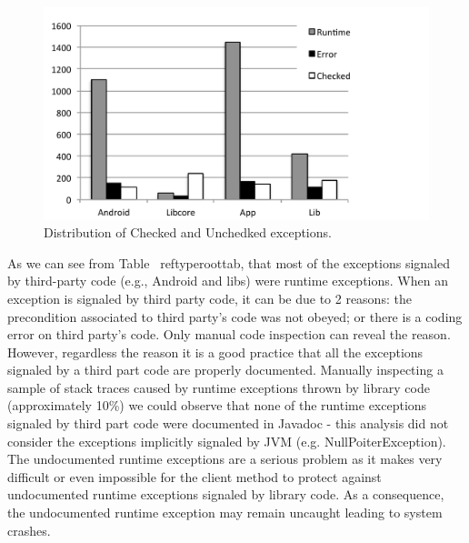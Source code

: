 \documentclass[conference]{IEEEtran}
\begin{document}
\begin{figure}
\centering
\includegraphics[scale=0.3]{chart_exceptiontypes.pdf}
\caption{Distribution of Checked and Unchedked exceptions.}
\label{fig:typeroot}
\end{figure}


As we can see from Table ~ref{typeroottab}, that most of the exceptions signaled by third-party code (e.g., Android and libs) were runtime exceptions. 
When an exception is signaled by third party code, it can be due to 2 reasons: the precondition associated to third party's code was not obeyed; or there is a coding error on third party's code. Only manual code inspection can reveal the reason. However, regardless the reason it is a good practice that all the exceptions signaled by a third part code are properly documented. Manually inspecting a sample of stack traces caused by runtime exceptions thrown by library code (approximately 10\%) we could observe that none of the runtime exceptions signaled by third part code were documented in Javadoc - this analysis did not consider the exceptions implicitly signaled by JVM (e.g. NullPoiterException). The undocumented runtime exceptions are a serious problem as it makes very difficult or even impossible for the  client method to protect against  undocumented runtime exceptions signaled by library code. As a consequence, the undocumented runtime exception may remain uncaught leading to  system crashes. 



\end{document}
